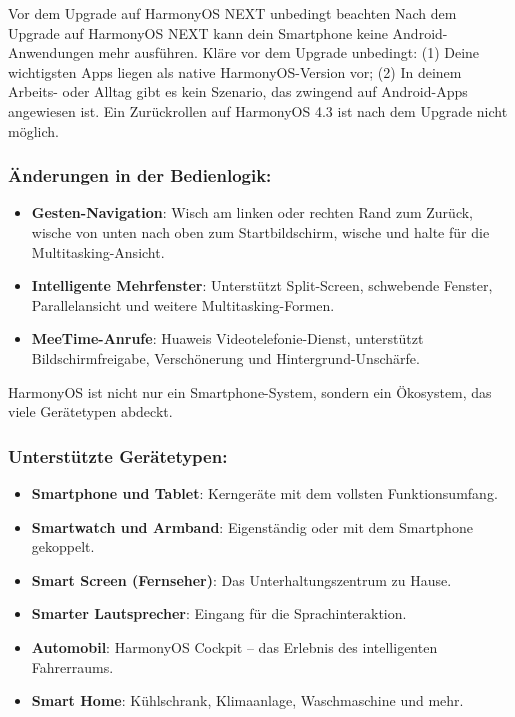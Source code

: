 \begin{tcbwarn}{Vor dem Upgrade auf HarmonyOS NEXT unbedingt beachten}
Nach dem Upgrade auf HarmonyOS NEXT kann dein Smartphone keine Android-Anwendungen mehr ausführen. Kläre vor dem Upgrade unbedingt: (1) Deine wichtigsten Apps liegen als native HarmonyOS-Version vor; (2) In deinem Arbeits- oder Alltag gibt es kein Szenario, das zwingend auf Android-Apps angewiesen ist. Ein Zurückrollen auf HarmonyOS 4.3 ist nach dem Upgrade nicht möglich.

\end{tcbwarn}

\subsubsection*{Änderungen in der Bedienlogik:}

\begin{itemize}
  \item \textbf{Gesten-Navigation}: Wisch am linken oder rechten Rand zum Zurück, wische von unten nach oben zum Startbildschirm, wische und halte für die Multitasking-Ansicht.
  \item \textbf{Intelligente Mehrfenster}: Unterstützt Split-Screen, schwebende Fenster, Parallelansicht und weitere Multitasking-Formen.
  \item \textbf{MeeTime-Anrufe}: Huaweis Videotelefonie-Dienst, unterstützt Bildschirmfreigabe, Verschönerung und Hintergrund-Unschärfe.
\end{itemize}


HarmonyOS ist nicht nur ein Smartphone-System, sondern ein Ökosystem, das viele Gerätetypen abdeckt.

\subsubsection*{Unterstützte Gerätetypen:}

\begin{itemize}
  \item \textbf{Smartphone und Tablet}: Kerngeräte mit dem vollsten Funktionsumfang.
  \item \textbf{Smartwatch und Armband}: Eigenständig oder mit dem Smartphone gekoppelt.
  \item \textbf{Smart Screen (Fernseher)}: Das Unterhaltungszentrum zu Hause.
  \item \textbf{Smarter Lautsprecher}: Eingang für die Sprachinteraktion.
  \item \textbf{Automobil}: HarmonyOS Cockpit – das Erlebnis des intelligenten Fahrerraums.
  \item \textbf{Smart Home}: Kühlschrank, Klimaanlage, Waschmaschine und mehr.
\end{itemize}


